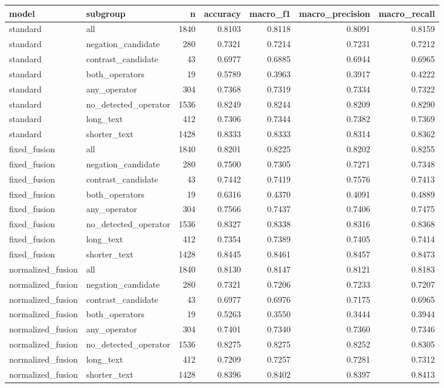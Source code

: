 \begin{tabular}{llrrrrr}
\toprule
model & subgroup & n & accuracy & macro_f1 & macro_precision & macro_recall \\
\midrule
standard & all & 1840 & 0.8103 & 0.8118 & 0.8091 & 0.8159 \\
standard & negation_candidate & 280 & 0.7321 & 0.7214 & 0.7231 & 0.7212 \\
standard & contrast_candidate & 43 & 0.6977 & 0.6885 & 0.6944 & 0.6965 \\
standard & both_operators & 19 & 0.5789 & 0.3963 & 0.3917 & 0.4222 \\
standard & any_operator & 304 & 0.7368 & 0.7319 & 0.7334 & 0.7322 \\
standard & no_detected_operator & 1536 & 0.8249 & 0.8244 & 0.8209 & 0.8290 \\
standard & long_text & 412 & 0.7306 & 0.7344 & 0.7382 & 0.7369 \\
standard & shorter_text & 1428 & 0.8333 & 0.8333 & 0.8314 & 0.8362 \\
fixed_fusion & all & 1840 & 0.8201 & 0.8225 & 0.8202 & 0.8255 \\
fixed_fusion & negation_candidate & 280 & 0.7500 & 0.7305 & 0.7271 & 0.7348 \\
fixed_fusion & contrast_candidate & 43 & 0.7442 & 0.7419 & 0.7576 & 0.7413 \\
fixed_fusion & both_operators & 19 & 0.6316 & 0.4370 & 0.4091 & 0.4889 \\
fixed_fusion & any_operator & 304 & 0.7566 & 0.7437 & 0.7406 & 0.7475 \\
fixed_fusion & no_detected_operator & 1536 & 0.8327 & 0.8338 & 0.8316 & 0.8368 \\
fixed_fusion & long_text & 412 & 0.7354 & 0.7389 & 0.7405 & 0.7414 \\
fixed_fusion & shorter_text & 1428 & 0.8445 & 0.8461 & 0.8457 & 0.8473 \\
normalized_fusion & all & 1840 & 0.8130 & 0.8147 & 0.8121 & 0.8183 \\
normalized_fusion & negation_candidate & 280 & 0.7321 & 0.7206 & 0.7233 & 0.7207 \\
normalized_fusion & contrast_candidate & 43 & 0.6977 & 0.6976 & 0.7175 & 0.6965 \\
normalized_fusion & both_operators & 19 & 0.5263 & 0.3550 & 0.3444 & 0.3944 \\
normalized_fusion & any_operator & 304 & 0.7401 & 0.7340 & 0.7360 & 0.7346 \\
normalized_fusion & no_detected_operator & 1536 & 0.8275 & 0.8275 & 0.8252 & 0.8305 \\
normalized_fusion & long_text & 412 & 0.7209 & 0.7257 & 0.7281 & 0.7312 \\
normalized_fusion & shorter_text & 1428 & 0.8396 & 0.8402 & 0.8397 & 0.8413 \\
\bottomrule
\end{tabular}
